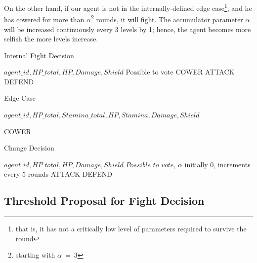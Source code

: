     On the other hand, if our agent is not in the internally-defined edge case\footnote{that is, it has not a critically low level of parameters required to survive the round}, and he has cowered for more than $\alpha$\footnote{starting with $\alpha~=~3$} rounds, it will fight. The accumulator parameter $\alpha$ will be increased continuously every 3 levels by 1; hence, the agent becomes more selfish the more levels increase.


    \begin{algorithm}
    \caption{Internal Fight Decision}
    \begin{algorithmic} 
    \Require $agent\_id, HP\_total, HP, Damage, Shield$
    \Ensure Possible to vote
    \Return COWER
    \EndIf
    \Return ATTACK
    \EndIf
    \Return DEFEND
    \EndIf
    \end{algorithmic}
    \end{algorithm}
    
    
    \begin{algorithm}
    \caption{Edge Case}
    \begin{algorithmic} 
    \Require $agent\_id, HP\_total,Stamina\_total, HP, Stamina, Damage, Shield$
    
    \Return COWER
    \EndIf
    \end{algorithmic}
    \end{algorithm}
    
    \begin{algorithm}
    \caption{Change Decision}
    \begin{algorithmic} 
    \Require $agent\_id, HP\_total, HP, Damage, Shield$
    \Ensure $Possible\_to\_vote$, $\alpha$ initially 0, increments every 5 rounds
    \Return ATTACK
    \Return DEFEND
    \EndIf
    \EndIf
    \EndIf
    \end{algorithmic}
    \end{algorithm}
    \pagebreak

\subsection{Threshold Proposal for Fight Decision}
    
